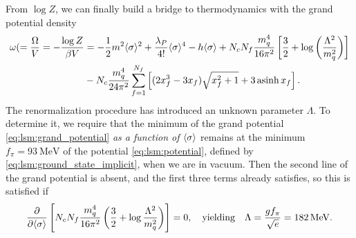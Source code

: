 From $\log Z$, we can finally build a bridge to thermodynamics with the grand potential density
\begin{equation}
\begin{split}
	\omega( = \frac{\Omega}{V} = -\frac{\log Z}{\beta V} &= -\frac12 m^2 \langle \sigma \rangle^2 + \frac{\lambda_P}{4!} \langle \sigma \rangle^4 - h \langle \sigma \rangle + N_c N_f \frac{m_q^4}{16 \pi^2} \left[ \frac{3}{2} + \log\left(\frac{{\Lambda}^2}{m_q^2}\right) \right] \\
	                                                    &- N_c \frac{m_q^4}{24 \pi^2} \sum_{f=1}^{N_f} \left[ (2 x_f^3 - 3x_f) \sqrt{x_f^2 + 1} + 3 \operatorname{asinh} x_f \right] .
\end{split}
\end{equation}
The renormalization procedure has introduced an unknown parameter $\Lambda$.
To determine it, we require that the minimum of the grand potential \eqref{eq:lsm:grand_potential} \emph{as a function of $\langle \sigma \rangle$} remains at the minimum $f_\pi = \SI{93}{\mega\electronvolt}$ of the potential \eqref{eq:lsm:potential}, defined by \eqref{eq:lsm:ground_state_implicit}, when we are in vacuum.
Then the second line of the grand potential is absent, and the first three terms already satisfies, so this is satisfied if
\begin{equation}
	\pdv*{\left[ N_c N_f \frac{m_q^4}{16 \pi^2} \left( \frac32 + \log \frac{\Lambda^2}{m_q^2} \right) \right] }{\langle \sigma \rangle} = 0,
	\quad \text{yielding} \quad
	\Lambda = \frac{g f_\pi}{\sqrt{e}} = \SI{182}{\mega\electronvolt}.
\label{eq:lsm:potential_vacuum_minimum}
\end{equation}

